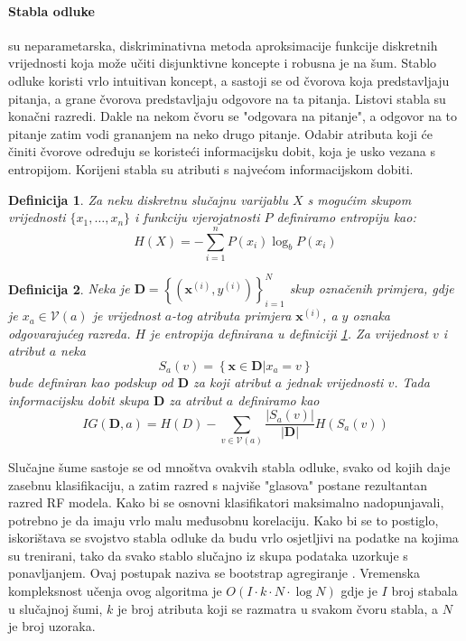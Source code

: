 \documentclass[times, utf8, diplomski]{fer}
\newtheorem{definition}{Definicija}         %
\begin{document}
\paragraph{Stabla odluke}
su neparametarska, diskriminativna metoda aproksimacije funkcije diskretnih vrijednosti koja može učiti disjunktivne koncepte i robusna je na šum. Stablo odluke koristi vrlo intuitivan koncept, a sastoji se od čvorova koja predstavljaju pitanja, a grane čvorova predstavljaju odgovore na ta pitanja. Listovi stabla su konačni razredi. Dakle na nekom čvoru se "odgovara na pitanje", a odgovor na to pitanje zatim vodi grananjem na neko drugo pitanje. Odabir atributa koji će činiti čvorove određuju se koristeći informacijsku dobit, koja je usko vezana s entropijom. Korijeni stabla su atributi s najvećom informacijskom dobiti.
\begin{definition}
    Za neku diskretnu slučajnu varijablu $X$ s mogućim skupom vrijednosti $\{x_1, \dots, x_n\}$ i funkciju vjerojatnosti $P$ definiramo entropiju kao:
    \begin{equation}
        H(X) = - \sum_{i=1}^n P(x_i) \log_b P(x_i)
    \end{equation}
    \label{def:entropy}
\end{definition}

\begin{definition}
    Neka je  $\bm{D} = \left\{ (\bm{x}^{(i)}, y^{(i)}) \right\}_{i=1}^N$ skup označenih primjera, gdje je $x_a \in \mathcal{V}(a)$ je vrijednost $a$-tog atributa primjera $\bm{x}^{(i)}$, a $y$ oznaka odgovarajućeg razreda. $H$ je entropija definirana u definiciji  \ref{def:entropy}. Za vrijednost $v$ i atribut $a$ neka
    \begin{equation}
        S_a(v) = \left\{ \bm{x} \in \bm{D} \vert x_a = v \right\}
    \end{equation}
    bude definiran kao podskup od $\bm{D}$ za koji atribut $a$ jednak vrijednosti $v$. Tada informacijsku dobit  skupa $\bm{D}$ za atribut $a$ definiramo kao
    \begin{equation}
        IG(\bm{D}, a) = H(D) - \sum_{v\in \mathcal{V}(a)}
        \frac{\vert S_a(v) \vert}{\vert \bm{D} \vert} H(S_a(v))
    \end{equation}
\end{definition}


Slučajne šume sastoje se od mnoštva ovakvih stabla odluke, svako od kojih daje zasebnu klasifikaciju, a zatim razred s najviše "glasova" postane rezultantan razred RF modela. Kako bi se osnovni klasifikatori maksimalno nadopunjavali, potrebno je da imaju vrlo malu međusobnu korelaciju. Kako bi se to postiglo, iskorištava se svojstvo stabla odluke da budu vrlo osjetljivi na podatke na kojima su trenirani, tako da svako stablo slučajno iz skupa podataka uzorkuje s ponavljanjem. Ovaj postupak naziva se bootstrap agregiranje . Vremenska kompleksnost učenja ovog algoritma je $O(I \cdot k \cdot N \cdot \log N)$ gdje je $I$ broj stabala u slučajnoj šumi, $k$ je broj atributa koji se razmatra u svakom čvoru stabla, a $N$ je broj uzoraka.
\end{document}
